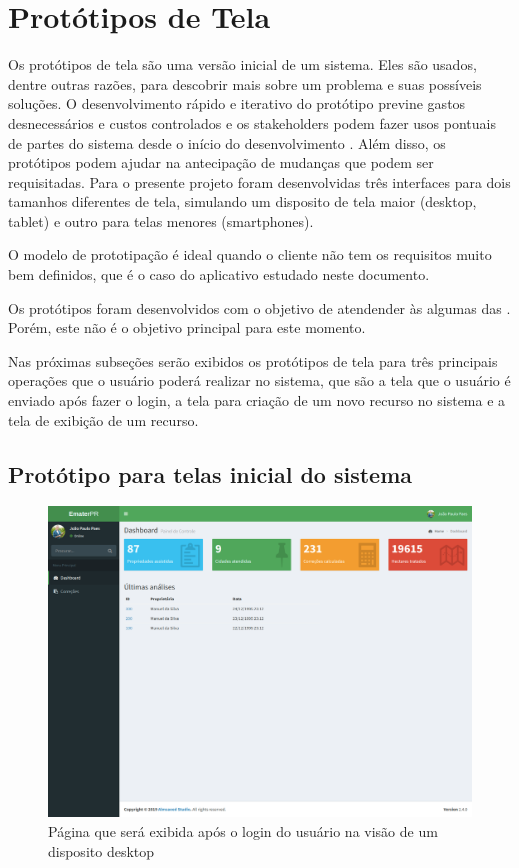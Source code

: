 \section{Protótipos de Tela}
\label{sec:titSecPrototipos}

Os protótipos de tela são uma versão inicial de um sistema. Eles são usados, dentre outras razões, para descobrir mais sobre um problema e suas possíveis soluções. O desenvolvimento rápido e iterativo do protótipo previne gastos desnecessários e custos controlados e os stakeholders podem fazer usos pontuais de partes do sistema desde o início do desenvolvimento \cite{Sommerville10}.
Além disso, os protótipos podem ajudar na antecipação de mudanças que podem ser requisitadas.
Para o presente projeto foram desenvolvidas três interfaces para dois tamanhos diferentes de tela, simulando um disposito de tela maior (desktop, tablet) e outro para telas menores (smartphones).

O modelo de prototipação é ideal quando o cliente não tem os requisitos muito bem definidos, que é o caso do aplicativo estudado neste documento.

Os protótipos foram desenvolvidos com o objetivo de atendender às algumas das \cite[10 Heurísticas de Nielsen]{Nielsen:1994:EEP:191666.191729}. Porém, este não é o objetivo principal para este momento.

Nas próximas subseções serão exibidos os protótipos de tela para três principais operações que o usuário poderá realizar no sistema, que são a tela que o usuário é enviado após fazer o login, a tela para criação de um novo recurso no sistema e a tela de exibição de um recurso.

\subsection{Protótipo para telas inicial do sistema}
\label{sec:titSecPrototiposHome}

\begin{figure}[H]
    \centering
    \includegraphics[width=13cm]{./dados/figuras/prototipos/home_desktop.png}
    \caption{Página que será exibida após o login do usuário na visão de um disposito desktop}
    \label{fig:prototipo_home_desk}
\end{figure}

